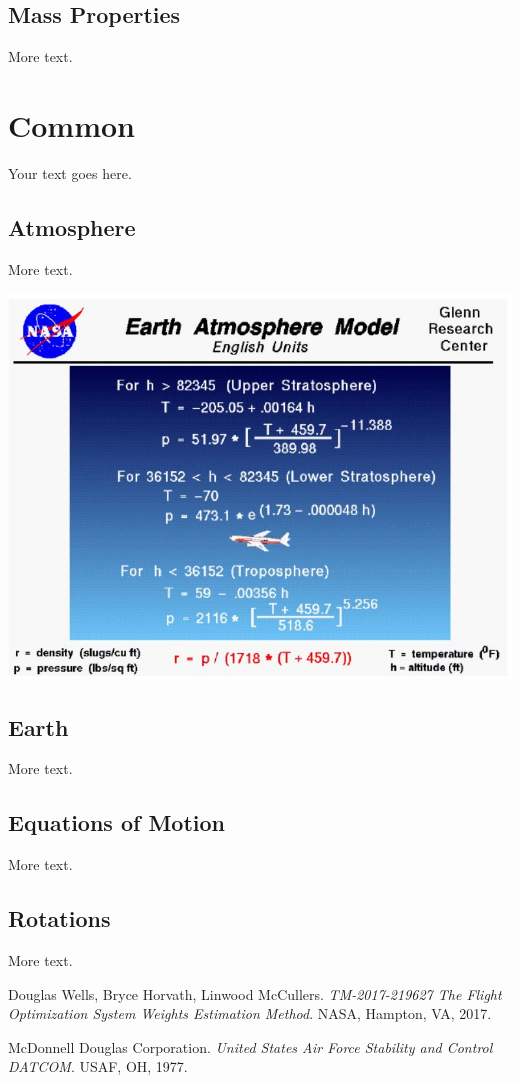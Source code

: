 \documentclass[11pt]{article} %
\begin{document}
\subsection{Mass Properties}

More text.

\section{Common}

Your text goes here.

\subsection{Atmosphere}

More text.
\begin{center}
    \includegraphics[width=1\textwidth]{atmosphere}
\end{center}

\subsection{Earth}

More text.

\subsection{Equations of Motion}

More text.

\subsection{Rotations}

More text.

\pagebreak

\begin{thebibliography}{9}
Douglas Wells, Bryce Horvath, Linwood McCullers. 
\textit{TM-2017-219627 The Flight Optimization System Weights Estimation Method}. 
NASA, Hampton, VA, 2017.

McDonnell Douglas Corporation. 
\textit{United States Air Force Stability and Control DATCOM}. 
USAF, OH, 1977.
\end{thebibliography}
\end{document}
